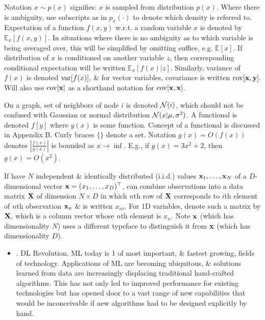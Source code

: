 \documentclass{article}
\begin{document}
\begin{itemize}
	Notation $x\sim p(x)$ signifies: $x$ is sampled from distribution $p(x)$. Where there is ambiguity, use subscripts as in $p_x(\cdot)$ to denote which density is referred to. Expectation of a function $f(x,y)$ w.r.t. a random variable $x$ is denoted by $\mathbb{E}_x[f(x,y)]$. In situations where there is no ambiguity as to which variable is being averaged over, this will be simplified by omitting suffice, e.g. $\mathbb{E}[x]$. If distribution of $x$ is conditioned on another variable $z$, then corresponding conditional expectation will be written $\mathbb{E}_x[f(x)|z]$. Similarly, variance of $f(x)$ is denoted ${\rm var}[f(x)]$, \& for vector variables, covariance is written ${\rm cov}[{\bf x},{\bf y}]$. Will also use ${\rm cov}[{\bf x}]$ as a shorthand notation for ${\rm cov}[{\bf x},{\bf x}]$.
	
	On a graph, set of neighbors of node $i$ is denoted ${\cal N}(i)$, which should not be confused with Gaussian or normal distribution ${\cal N}(x|\mu,\sigma^2)$. A functional is denoted $f[y]$ where $y(x)$ is some function. Concept of a functional is discussed in Appendix B. Curly braces $\{\}$ denote a set. Notation $g(x) = O(f(x))$ denotes $\left|\frac{f(x)}{g(x)}\right|$ is bounded as $x\to\inf$. E.g., if $g(x) = 3x^2 + 2$, then $g(x) = O(x^2)$.
	
	If have $N$ independent \& identically distributed (i.i.d.) values ${\bf x}_1,\ldots,{\bf x}_N$ of a $D$-dimensional vector ${\bf x} = (x_1,\ldots,x_D)^\top$, can combine observations into a data matrix ${\bf X}$ of dimension $N\times D$ in which $n$th row of ${\bf X}$ corresponds to $i$th element of $n$th observation ${\bf x}_n$ \& is written $x_{ni}$. For 1D variables, denote such a matrix by ${\bf X}$, which is a column vector whose $n$th element is $x_n$. Note ${\bf x}$ (which has dimensionality $N$) uses a different typeface to distinguish it from ${\bf x}$ (which has dimensionality $D$).
	\begin{itemize}
		\item {. DL Revolution.} ML today is 1 of most important, \& fastest growing, fields of technology. Applications of ML are becoming ubiquitous, \& solutions learned from data are increasingly displacing traditional hand-crafted algorithms. This has not only led to improved performance for existing technologies but has opened door to a vast range of new capabilities that would be inconceivable if new algorithms had to be designed explicitly by hand.
		

\end{itemize}
\end{itemize}
\end{document}

